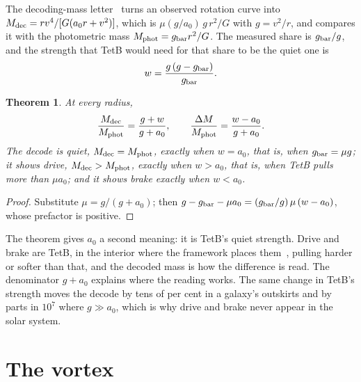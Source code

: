 \documentclass[twocolumn]{iopjournal}
\newtheorem{theorem}{Theorem}
\theoremstyle{definition}
\theoremstyle{remark}
\begin{document}
The decoding-mass letter~\cite{NelsonDecode} turns an observed rotation
curve into $M_{\rm dec} = rv^4/[G(a_0r + v^2)]$, which is
$\mu(g/a_0)\,g\,r^2/G$ with $g = v^2/r$, and compares it with the
photometric mass $M_{\rm phot} = g_{\rm bar} r^2/G$. The measured share is
$g_{\rm bar}/g$, and the strength that TetB would need for that share to be
the quiet one is
\begin{equation}
  w = \frac{g\,(g - g_{\rm bar})}{g_{\rm bar}}.
\end{equation}

\begin{theorem}\label{thm:decode}
At every radius,
\begin{equation}
  \frac{M_{\rm dec}}{M_{\rm phot}} = \frac{g + w}{g + a_0},\qquad
  \frac{\Delta M}{M_{\rm phot}} = \frac{w - a_0}{g + a_0}.
\end{equation}
The decode is quiet, $M_{\rm dec} = M_{\rm phot}$, exactly when $w = a_0$,
that is, when $g_{\rm bar} = \mu g$; it shows drive,
$M_{\rm dec} > M_{\rm phot}$, exactly when $w > a_0$, that is, when TetB
pulls more than $\mu a_0$; and it shows brake exactly when $w < a_0$.
\end{theorem}

\begin{proof}
Substitute $\mu = g/(g+a_0)$; then
$g - g_{\rm bar} - \mu a_0 = (g_{\rm bar}/g)\,\mu\,(w - a_0)$, whose prefactor
is positive.
\end{proof}

The theorem gives $a_0$ a second meaning: it is TetB's quiet strength.
Drive and brake are TetB, in the interior where the framework places
them~\cite{NelsonHourglass}, pulling harder or softer than that, and the
decoded mass is how the difference is read. The denominator $g + a_0$
explains where the reading works. The same change in TetB's strength moves
the decode by tens of per cent in a galaxy's outskirts and by parts in
$10^7$ where $g \gg a_0$, which is why drive and brake never appear in the
solar system.

\section*{The vortex}
\end{document}
